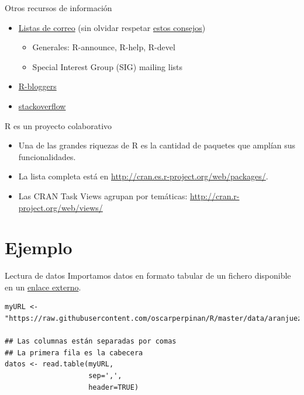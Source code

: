 \documentclass[xcolor={usenames,svgnames,dvipsnames}]{beamer}
\begin{document}
\begin{frame}[label={sec:orgbd062f8}]{Otros recursos de información}
\begin{itemize}
\item \href{http://www.r-project.org/mail.html}{Listas de correo} (sin olvidar respetar \href{http://www.r-project.org/posting-guide.html}{estos consejos})
\begin{itemize}
\item Generales: R-announce, R-help, R-devel
\item Special Interest Group (SIG) mailing lists
\end{itemize}
\item \href{http://www.r-bloggers.com}{R-bloggers}
\item \href{http://stackoverflow.com/questions/tagged/r}{stackoverflow}
\end{itemize}
\end{frame}

\begin{frame}[label={sec:org2c8cc76}]{R es un proyecto colaborativo}
\begin{itemize}
\item Una de las grandes riquezas de R es la cantidad de paquetes que amplían sus funcionalidades.
\item La lista completa está en \url{http://cran.es.r-project.org/web/packages/}.
\item Las CRAN Task Views agrupan por temáticas:
\url{http://cran.r-project.org/web/views/}
\end{itemize}
\end{frame}


\section{Ejemplo}
\label{sec:org640ae78}

\begin{frame}[fragile,label={sec:orged86736}]{Lectura de datos}
 Importamos datos en formato tabular de un fichero disponible en un \href{https://raw.githubusercontent.com/oscarperpinan/R/master/data/aranjuez.csv}{enlace externo}. 
\lstset{language=r,label= ,caption= ,captionpos=b,numbers=none}
\begin{lstlisting}
myURL <- "https://raw.githubusercontent.com/oscarperpinan/R/master/data/aranjuez.csv"

## Las columnas están separadas por comas
## La primera fila es la cabecera
datos <- read.table(myURL,
                    sep=',',
                    header=TRUE)
\end{lstlisting}
\end{frame}
\end{document}
